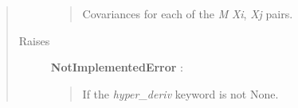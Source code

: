 \documentclass[letterpaper,10pt,english]{sphinxmanual}
\begin{document}
\begin{fulllineitems}
\begin{fulllineitems}
\begin{quote}
\begin{description}
\begin{quote}
Covariances for each of the \emph{M} \emph{Xi}, \emph{Xj} pairs.
\end{quote}

\item[{Raises}] \leavevmode
\textbf{NotImplementedError} :
\begin{quote}

If the \emph{hyper\_deriv} keyword is not None.
\end{quote}

\end{description}\end{quote}

\end{fulllineitems}


\end{fulllineitems}

\end{document}
